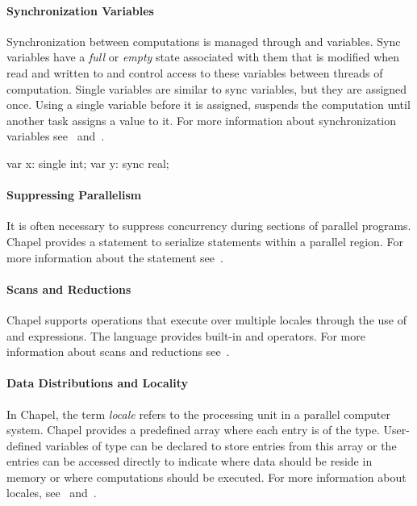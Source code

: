 \paragraph{Synchronization Variables}
Synchronization between computations is managed through 
and  variables.  Sync variables have a {\em full} or {\em
empty} state associated with them that is modified when read and
written to and control access to these variables between threads of
computation.  Single variables are similar to sync variables, but they
are assigned once.  Using a single variable before it is assigned,
suspends the computation until another task assigns a value to it.
For more information about synchronization variables
see~ and~.
\begin{chapel}
var x: single int;
var y: sync real;
\end{chapel}

\paragraph{Suppressing Parallelism}
It is often necessary to suppress concurrency during sections of
parallel programs.  Chapel provides a  statement to
serialize statements within a parallel region.  For more information
about the  statement see~.


\paragraph{Scans and Reductions}
Chapel supports operations that execute over multiple locales through
the use of  and  expressions.  The language
provides built-in  and  operators.  For more
information about scans and reductions see~.

\paragraph{Data Distributions and Locality}

In Chapel, the term {\em locale} refers to the processing unit in a
parallel computer system.  Chapel provides a predefined
array  where each entry is of the  type.
User-defined variables of  type can be declared to store
entries from this  array or the entries can be accessed
directly to indicate where data should be reside in memory or where
computations should be executed.  For more information about locales,
see~ and~.

